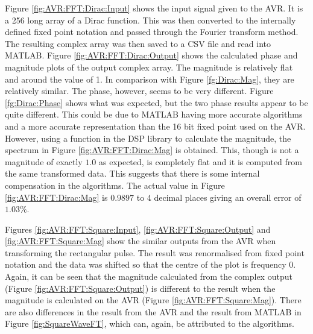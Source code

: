 Figure \ref{fig:AVR:FFT:Dirac:Input} shows the input signal given to the AVR. It is a 256 long array of a Dirac function. This was then converted to the internally defined fixed point notation and passed through the Fourier transform method. The resulting complex array was then saved to a CSV file and read into MATLAB. Figure \ref{fig:AVR:FFT:Dirac:Output} shows the calculated phase and magnitude plots of the output complex array. The magnitude is relatively flat and around the value of 1. In comparison with Figure \ref{fg:Dirac:Mag}, they are relatively similar. The phase, however, seems to be very different. Figure \ref{fg:Dirac:Phase} shows what was expected, but the two phase results appear to be quite different. This could be due to MATLAB having more accurate algorithms and a more accurate representation than the 16 bit fixed point used on the AVR. However, using a function in the DSP library to calculate the magnitude, the spectrum in Figure \ref{fig:AVR:FFT:Dirac:Mag} is obtained. This, though is not a magnitude of exactly $1.0$ as expected, is completely flat and it is computed from the same transformed data. This suggests that there is some internal compensation in the algorithms. The actual value in Figure \ref{fig:AVR:FFT:Dirac:Mag} is $0.9897$ to 4 decimal places giving an overall error of $1.03\%$. 

Figures \ref{fig:AVR:FFT:Square:Input}, \ref{fig:AVR:FFT:Square:Output} and \ref{fig:AVR:FFT:Square:Mag} show the similar outputs from the AVR when transforming the rectangular pulse. The result was renormalised from fixed point notation and the data was shifted so that the centre of the plot is frequency 0.  Again, it can be seen that the magnitude calculated from the complex output (Figure \ref{fig:AVR:FFT:Square:Output}) is different to the result when the magnitude is calculated on the AVR (Figure \ref{fig:AVR:FFT:Square:Mag}). There are also differences in the result from the AVR and the result from MATLAB in Figure \ref{fig:SquareWaveFT}, which can, again, be attributed to the algorithms. 


